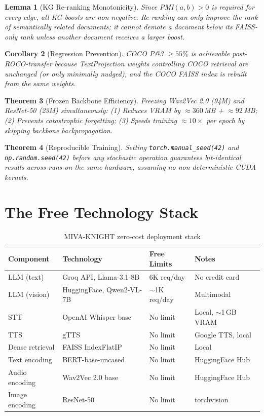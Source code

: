 \documentclass[12pt,a4paper]{article}
\theoremstyle{definition}
\theoremstyle{plain}
\newtheorem{theorem}{Theorem}[section]
\newtheorem{lemma}[theorem]{Lemma}
\newtheorem{corollary}[theorem]{Corollary}
\theoremstyle{remark}
\begin{document}
\begin{lemma}[KG Re-ranking Monotonicity]
Since PMI$(a,b) > 0$ is required for every edge, all KG boosts are non-negative. Re-ranking can only improve the rank of semantically related documents; it cannot demote a document below its FAISS-only rank unless another document receives a larger boost.
\end{lemma}

\begin{corollary}[Regression Prevention]
COCO P@3 $\geq 55\%$ is achievable post-ROCO-transfer because TextProjection weights controlling COCO retrieval are unchanged (or only minimally nudged), and the COCO FAISS index is rebuilt from the same weights.
\end{corollary}

\begin{theorem}[Frozen Backbone Efficiency]
Freezing Wav2Vec 2.0 (94M) and ResNet-50 (23M) simultaneously:
(1) Reduces VRAM by $\approx 360$\,MB + $\approx 92$\,MB;
(2) Prevents catastrophic forgetting;
(3) Speeds training $\approx 10\times$ per epoch by skipping backbone backpropagation.
\end{theorem}

\begin{theorem}[Reproducible Training]
Setting \texttt{torch.manual\_seed(42)} and \texttt{np.random.seed(42)} before any stochastic operation guarantees bit-identical results across runs on the same hardware, assuming no non-deterministic CUDA kernels.
\end{theorem}

\newpage
\section{The Free Technology Stack}

\begin{table}[H]
\centering
\caption{MIVA-KNIGHT zero-cost deployment stack}
\begin{tabular}{llll}
\toprule
\textbf{Component} & \textbf{Technology} & \textbf{Free Limits} & \textbf{Notes} \\
\midrule
LLM (text) & Groq API, Llama-3.1-8B & 6K req/day & No credit card \\
LLM (vision) & HuggingFace, Qwen2-VL-7B & $\sim$1K req/day & Multimodal \\
STT & OpenAI Whisper base & No limit & Local, $\sim$1\,GB VRAM \\
TTS & gTTS & No limit & Google TTS, local \\
Dense retrieval & FAISS IndexFlatIP & No limit & Local \\
Text encoding & BERT-base-uncased & No limit & HuggingFace Hub \\
Audio encoding & Wav2Vec 2.0 base & No limit & HuggingFace Hub \\
Image encoding & ResNet-50 & No limit & torchvision \\
\bottomrule
\end{tabular}
\end{table}
\end{document}
